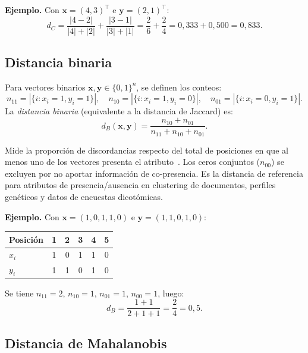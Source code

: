 \textbf{Ejemplo.} Con $\mathbf{x}=(4,3)^{\top}$ e $\mathbf{y}=(2,1)^{\top}$:
\[
d_C = \frac{|4-2|}{|4|+|2|} + \frac{|3-1|}{|3|+|1|} = \frac{2}{6} + \frac{2}{4} = 0{,}333 + 0{,}500 = 0{,}833.
\]

\subsection{Distancia binaria}

\begin{definition}
Para vectores binarios $\mathbf{x},\mathbf{y}\in\{0,1\}^n$, se definen los conteos:
\[
n_{11}=|\{i:x_i=1,y_i=1\}|,\quad n_{10}=|\{i:x_i=1,y_i=0\}|,\quad n_{01}=|\{i:x_i=0,y_i=1\}|.
\]
La \emph{distancia binaria} (equivalente a la distancia de Jaccard) es:
\[
d_B(\mathbf{x},\mathbf{y}) = \frac{n_{10}+n_{01}}{n_{11}+n_{10}+n_{01}}.
\]
\end{definition}

Mide la proporción de discordancias respecto del total de posiciones en que al menos uno de los vectores presenta el atributo~\cite{real1996probabilistic}. Los ceros conjuntos ($n_{00}$) se excluyen por no aportar información de co-presencia. Es la distancia de referencia para atributos de presencia/ausencia en clustering de documentos, perfiles genéticos y datos de encuestas dicotómicas.

\textbf{Ejemplo.} Con $\mathbf{x}=(1,0,1,1,0)$ e $\mathbf{y}=(1,1,0,1,0)$:

\begin{center}
\begin{tabular}{lccccc}
\toprule
Posición & 1 & 2 & 3 & 4 & 5 \\
\midrule
$x_i$ & 1 & 0 & 1 & 1 & 0 \\
$y_i$ & 1 & 1 & 0 & 1 & 0 \\
\bottomrule
\end{tabular}
\end{center}
Se tiene $n_{11}=2$, $n_{10}=1$, $n_{01}=1$, $n_{00}=1$, luego:
\[
d_B = \frac{1+1}{2+1+1} = \frac{2}{4} = 0{,}5.
\]

\subsection{Distancia de Mahalanobis}

